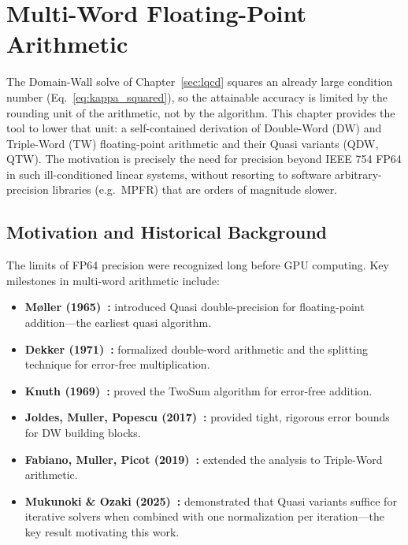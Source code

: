 \documentclass[12pt,a4paper]{article}
\begin{document}

\section{Multi-Word Floating-Point Arithmetic}
\label{sec:multiword}

The Domain-Wall solve of Chapter~\ref{sec:lqcd} squares an already large
condition number (Eq.~\eqref{eq:kappa_squared}), so the attainable accuracy is
limited by the rounding unit of the arithmetic, not by the algorithm. This
chapter provides the tool to lower that unit: a self-contained derivation of
Double-Word (DW) and Triple-Word (TW) floating-point arithmetic and their Quasi
variants (QDW, QTW). The motivation is precisely the need for precision beyond
IEEE 754 FP64 in such ill-conditioned linear systems, without resorting to
software arbitrary-precision libraries (e.g.\ MPFR) that are orders of magnitude
slower.

\subsection{Motivation and Historical Background}

The limits of FP64 precision were recognized long before GPU computing.
Key milestones in multi-word arithmetic include:

\begin{itemize}
  \item \textbf{M\o{}ller (1965)~\cite{Moller1965}:} introduced Quasi double-precision
        for floating-point addition---the earliest quasi algorithm.
  \item \textbf{Dekker (1971)~\cite{Dekker1971}:} formalized double-word arithmetic
        and the splitting technique for error-free multiplication.
  \item \textbf{Knuth (1969)~\cite{Knuth1969}:} proved the TwoSum algorithm for
        error-free addition.
  \item \textbf{Joldes, Muller, Popescu (2017)~\cite{Joldes2017}:} provided
        tight, rigorous error bounds for DW building blocks.
  \item \textbf{Fabiano, Muller, Picot (2019)~\cite{Fabiano2019}:} extended the
        analysis to Triple-Word arithmetic.
  \item \textbf{Mukunoki \& Ozaki (2025)~\cite{Mukunoki2025}:} demonstrated that
        Quasi variants suffice for iterative solvers when combined with one
        normalization per iteration---the key result motivating this work.
\end{itemize}
\end{document}
